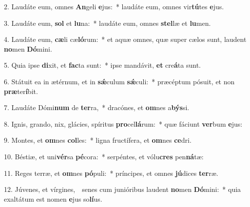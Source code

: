 
2. Laudáte eum, omnes \textbf{An}geli \textbf{e}jus:~* laudáte eum, omnes vir\textbf{tú}tes \textbf{e}jus.

3. Laudáte eum, \textbf{sol} et \textbf{lu}na:~* laudáte eum, omnes \textbf{stel}læ et \textbf{lu}men.

4. Laudáte eum, \textbf{cæ}li cæ\textbf{ló}rum:~* et aquæ omnes, quæ super cælos sunt, laudent \textbf{no}men \textbf{Dó}mini.

5. Quia ipse \textbf{di}xit, et \textbf{fac}ta sunt:~* ipse mandávit, \textbf{et} cre\textbf{á}ta sunt.

6. Státuit ea in ætérnum, et in \textbf{s\'{\ae}}culum \textbf{s\'{\ae}}culi:~* præcéptum pósuit, et non \textbf{præ}ter\textbf{í}bit.

7. Laudáte Dómi\textbf{num} de \textbf{ter}ra,~* dracónes, et \textbf{om}nes a\textbf{býs}si.

8. Ignis, grando, nix, glácies, spíritus \textbf{pro}cel\textbf{lá}rum:~* quæ fáciunt \textbf{ver}bum \textbf{e}jus:

9. Montes, et \textbf{om}nes \textbf{col}les:~* ligna fructífera, et \textbf{om}nes \textbf{ce}dri.

10. Béstiæ, et uni\textbf{vér}sa \textbf{pé}cora:~* serpéntes, et vólu\textbf{cres} pen\textbf{ná}tæ:

11. Reges terræ, et \textbf{om}nes \textbf{pó}puli:~* príncipes, et omnes \textbf{jú}dices \textbf{ter}ræ.

12. Júvenes, et vírgines,~\GreDagger\ senes cum junióribus laudent \textbf{no}men \textbf{Dó}mini:~* quia exaltátum est nomen \textbf{e}jus so\textbf{lí}us.

